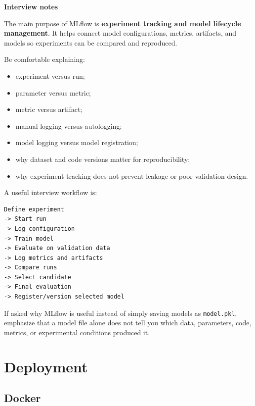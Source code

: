 \documentclass[11pt,letterpaper]{article}
\begin{document}
\textbf{Interview notes}

The main purpose of MLflow is \textbf{experiment tracking and model lifecycle
management}. It helps connect model configurations, metrics, artifacts, and
models so experiments can be compared and reproduced.

Be comfortable explaining:

\begin{itemize}[leftmargin=*]
    \item experiment versus run;
    \item parameter versus metric;
    \item metric versus artifact;
    \item manual logging versus autologging;
    \item model logging versus model registration;
    \item why dataset and code versions matter for reproducibility;
    \item why experiment tracking does not prevent leakage or poor validation design.
\end{itemize}

A useful interview workflow is:

\begin{lstlisting}
Define experiment
-> Start run
-> Log configuration
-> Train model
-> Evaluate on validation data
-> Log metrics and artifacts
-> Compare runs
-> Select candidate
-> Final evaluation
-> Register/version selected model
\end{lstlisting}

If asked why MLflow is useful instead of simply saving models as
\texttt{model.pkl}, emphasize that a model file alone does not tell you which
data, parameters, code, metrics, or experimental conditions produced it.



\section{Deployment}


\subsection{Docker}
\end{document}
